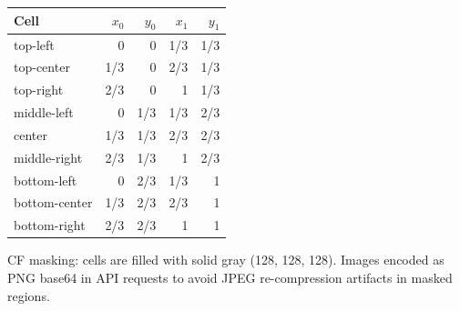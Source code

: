 \documentclass[twoside,11pt]{article}
\begin{document}
\begin{center}
\small
\begin{tabular}{lrrrr}
\toprule
Cell & $x_0$ & $y_0$ & $x_1$ & $y_1$ \\
\midrule
top-left    & 0   & 0   & 1/3 & 1/3 \\
top-center  & 1/3 & 0   & 2/3 & 1/3 \\
top-right   & 2/3 & 0   & 1   & 1/3 \\
middle-left & 0   & 1/3 & 1/3 & 2/3 \\
center      & 1/3 & 1/3 & 2/3 & 2/3 \\
middle-right& 2/3 & 1/3 & 1   & 2/3 \\
bottom-left & 0   & 2/3 & 1/3 & 1   \\
bottom-center&1/3 & 2/3 & 2/3 & 1   \\
bottom-right& 2/3 & 2/3 & 1   & 1   \\
\bottomrule
\end{tabular}
\end{center}

\noindent CF masking: cells are filled with solid gray (128, 128, 128).
Images encoded as PNG base64 in API requests to avoid JPEG re-compression
artifacts in masked regions.
\end{document}
